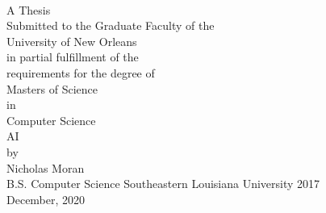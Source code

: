 \begin{titlepage}
    \begin{center}

        \\
        \vspace*{66pt}
        A Thesis\\
        \vspace*{66pt}
        Submitted to the Graduate Faculty of the \\ University of New Orleans \\ in partial fulfillment of the \\ requirements for the degree of \\
        \vspace*{66pt}
        Masters of Science \\ in\\ Computer Science  \\
        AI \\
        \vspace*{66pt}
        by\\
        Nicholas Moran\\
        B.S. Computer Science Southeastern Louisiana University 2017\\
        \vspace*{11pt}
        December, 2020\\         
    \end{center}
 \end{titlepage}